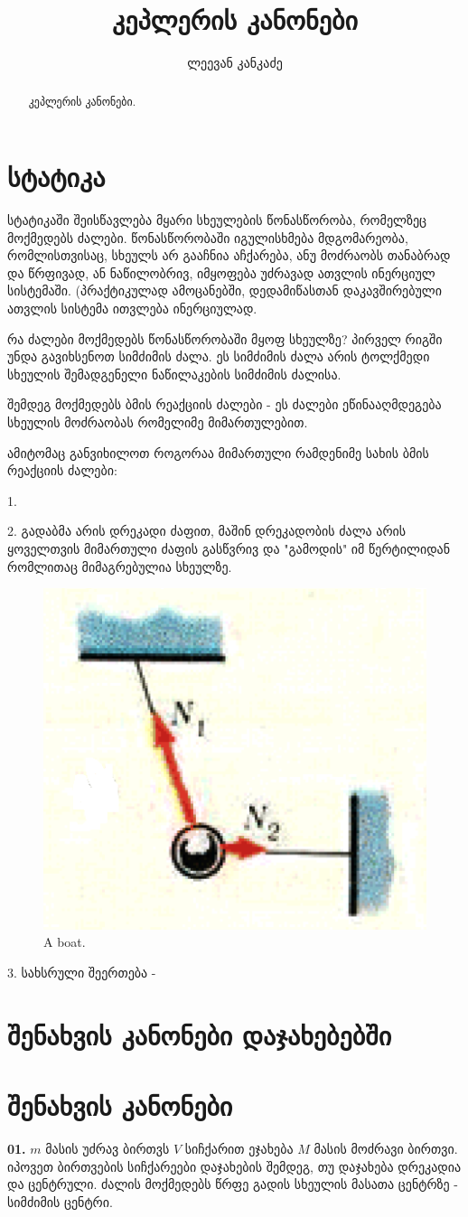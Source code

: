 \documentclass[a4paper]{article}
\title{კეპლერის კანონები}
\author{ლეევან კანკაძე}
\begin{document}
	\maketitle
	
	\begin{abstract}
		კეპლერის კანონები.
	\end{abstract}
	
	\section{სტატიკა} სტატიკაში შეისწავლება მყარი სხეულების წონასწორობა, რომელზეც მოქმედებს ძალები. წონასწორობაში იგულისხმება მდგომარეობა, რომლისთვისაც, სხეულს არ გააჩნია აჩქარება, ანუ მოძრაობს თანაბრად და წრფივად, ან ნაწილობრივ, იმყოფება უძრავად ათვლის ინერციულ სისტემაში. (პრაქტიკულად ამოცანებში, დედამიწასთან დაკავშირებული ათვლის სისტემა ითვლება ინერციულად.
	
	რა ძალები მოქმედებს წონასწორობაში მყოფ სხეულზე? პირველ რიგში უნდა გავიხსენოთ სიმძიმის ძალა. ეს სიმძიმის ძალა არის ტოლქმედი სხეულის შემადგენელი ნაწილაკების სიმძიმის ძალისა.
	
	შემდეგ მოქმედებს ბმის რეაქციის ძალები - ეს ძალები ეწინააღმდეგება სხეულის მოძრაობას რომელიმე მიმართულებით.
	
	
	ამიტომაც განვიხილოთ როგორაა მიმართული რამდენიმე სახის ბმის რეაქციის ძალები:
	
	1. 
	
	2. გადაბმა არის დრეკადი ძაფით, მაშინ დრეკადობის ძალა არის ყოველთვის მიმართული ძაფის გასწვრივ და "გამოდის" იმ წერტილიდან რომლითაც მიმაგრებულია სხეულზე.
		\begin{figure}[H]
	 	\centering
           \includegraphics[width=0.2\columnwidth]{figures/static_c}
           \caption{A boat.}
           \label{fig:boat1}
        \end{figure}
	 
	 3. სახსრული შეერთება - 
	 
	\section{შენახვის კანონები დაჯახებებში}
	 
	\section{შენახვის კანონები}
	\textbf{01.} $m$ მასის უძრავ ბირთვს $V$ სიჩქარით ეჯახება $M$ მასის მოძრავი ბირთვი. იპოვეთ ბირთვების სიჩქარეები დაჯახების შემდეგ, თუ დაჯახება დრეკადია და ცენტრული. ძალის მოქმედებს წრფე გადის სხეულის მასათა ცენტრზე - სიმძიმის ცენტრი.
		
\end{document}

